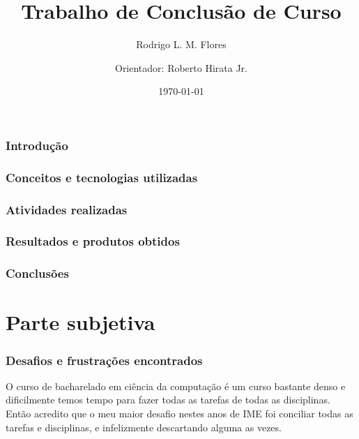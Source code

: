 \documentclass[a4paper,12pt,titlepage]{article}
\title{Trabalho de Conclusão de Curso \\ }
\author{Rodrigo L. M. Flores \and
        Orientador: Roberto Hirata Jr. }
\date{\today}
\begin{document}
\maketitle

\part{}

\section{Introdução}



\section{Conceitos e tecnologias utilizadas}



\section{Atividades realizadas}



\section{Resultados e produtos obtidos}





\section{Conclusões}





\newpage



\part{Parte subjetiva}

\section{Desafios e frustrações encontrados}

O curso de bacharelado em ciência da computação é um curso bastante denso e dificilmente temos tempo
para fazer todas as tarefas de todas as disciplinas. Então acredito que o meu maior desafio nestes anos de IME 
foi conciliar todas as tarefas e disciplinas, e infelizmente descartando alguma as vezes. 
\end{document}

